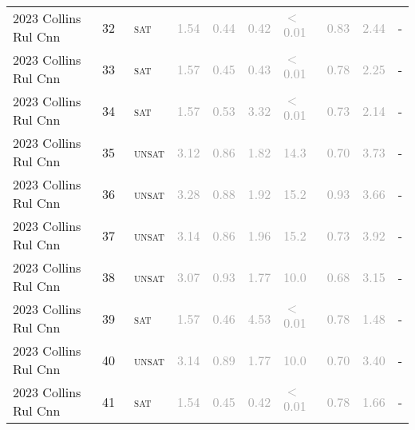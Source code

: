 \begin{center}
{\begin{longtable}{@{}llllllllll@{}}
2023 Collins Rul Cnn & 32 & ~\textsc{sat} & \textcolor{darkgray}{1.54} & \textcolor{darkgray}{0.44} & \textcolor{darkgray}{0.42} & \textcolor{darkgray}{$<$0.01} & \textcolor{darkgray}{0.83} & \textcolor{darkgray}{2.44} & - \\
2023 Collins Rul Cnn & 33 & ~\textsc{sat} & \textcolor{darkgray}{1.57} & \textcolor{darkgray}{0.45} & \textcolor{darkgray}{0.43} & \textcolor{darkgray}{$<$0.01} & \textcolor{darkgray}{0.78} & \textcolor{darkgray}{2.25} & - \\
2023 Collins Rul Cnn & 34 & ~\textsc{sat} & \textcolor{darkgray}{1.57} & \textcolor{darkgray}{0.53} & \textcolor{darkgray}{3.32} & \textcolor{darkgray}{$<$0.01} & \textcolor{darkgray}{0.73} & \textcolor{darkgray}{2.14} & - \\
2023 Collins Rul Cnn & 35 & ~\textsc{unsat} & \textcolor{darkgray}{3.12} & \textcolor{darkgray}{0.86} & \textcolor{darkgray}{1.82} & \textcolor{darkgray}{14.3} & \textcolor{darkgray}{0.70} & \textcolor{darkgray}{3.73} & - \\
2023 Collins Rul Cnn & 36 & ~\textsc{unsat} & \textcolor{darkgray}{3.28} & \textcolor{darkgray}{0.88} & \textcolor{darkgray}{1.92} & \textcolor{darkgray}{15.2} & \textcolor{darkgray}{0.93} & \textcolor{darkgray}{3.66} & - \\
2023 Collins Rul Cnn & 37 & ~\textsc{unsat} & \textcolor{darkgray}{3.14} & \textcolor{darkgray}{0.86} & \textcolor{darkgray}{1.96} & \textcolor{darkgray}{15.2} & \textcolor{darkgray}{0.73} & \textcolor{darkgray}{3.92} & - \\
2023 Collins Rul Cnn & 38 & ~\textsc{unsat} & \textcolor{darkgray}{3.07} & \textcolor{darkgray}{0.93} & \textcolor{darkgray}{1.77} & \textcolor{darkgray}{10.0} & \textcolor{darkgray}{0.68} & \textcolor{darkgray}{3.15} & - \\
2023 Collins Rul Cnn & 39 & ~\textsc{sat} & \textcolor{darkgray}{1.57} & \textcolor{darkgray}{0.46} & \textcolor{darkgray}{4.53} & \textcolor{darkgray}{$<$0.01} & \textcolor{darkgray}{0.78} & \textcolor{darkgray}{1.48} & - \\
2023 Collins Rul Cnn & 40 & ~\textsc{unsat} & \textcolor{darkgray}{3.14} & \textcolor{darkgray}{0.89} & \textcolor{darkgray}{1.77} & \textcolor{darkgray}{10.0} & \textcolor{darkgray}{0.70} & \textcolor{darkgray}{3.40} & - \\
2023 Collins Rul Cnn & 41 & ~\textsc{sat} & \textcolor{darkgray}{1.54} & \textcolor{darkgray}{0.45} & \textcolor{darkgray}{0.42} & \textcolor{darkgray}{$<$0.01} & \textcolor{darkgray}{0.78} & \textcolor{darkgray}{1.66} & - \\

\end{longtable}}
\end{center}
